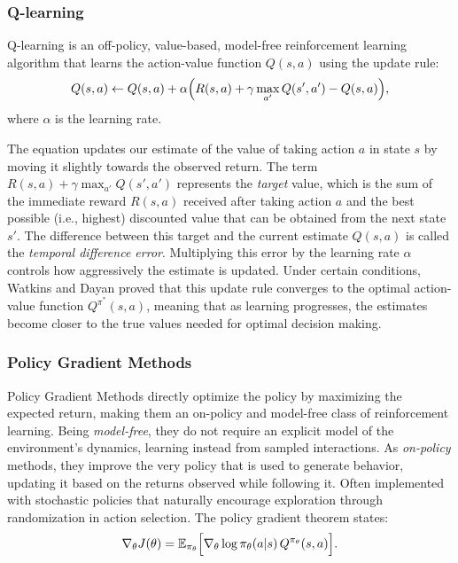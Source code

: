 \documentclass[12pt,a4paper,twoside,openany]{book}
\begin{document}
\subsubsection*{Q-learning}

Q-learning is an off-policy, value-based, model-free reinforcement learning algorithm that learns the action-value function \(Q(s,a)\) using the update rule:
\[
Q(s,a) \leftarrow Q(s,a) + \alpha \Bigl( R(s,a) + \gamma \max_{a'} Q(s', a') - Q(s,a) \Bigr),
\]
where \(\alpha\) is the learning rate.

The equation updates our estimate of the value of taking action \(a\) in state \(s\) by moving it slightly towards the observed return. The term \(R(s,a) + \gamma \max_{a'} Q(s', a')\) represents the \emph{target} value, which is the sum of the immediate reward \(R(s,a)\) received after taking action \(a\) and the best possible (i.e., highest) discounted value that can be obtained from the next state \(s'\). The difference between this target and the current estimate \(Q(s,a)\) is called the \emph{temporal difference error}. Multiplying this error by the learning rate \(\alpha\) controls how aggressively the estimate is updated. Under certain conditions, Watkins and Dayan \cite{Watkins1992} proved that this update rule converges to the optimal action-value function \(Q^{\pi^*}(s,a)\), meaning that as learning progresses, the estimates become closer to the true values needed for optimal decision making.

\subsubsection*{Policy Gradient Methods}

Policy Gradient Methods directly optimize the policy by maximizing the expected return, making them an on-policy and model-free class of reinforcement learning. Being \textit{model-free}, they do not require an explicit model of the environment’s dynamics, learning instead from sampled interactions. As \textit{on-policy} methods, they improve the very policy that is used to generate behavior, updating it based on the returns observed while following it. Often implemented with stochastic policies that naturally encourage exploration through randomization in action selection. The policy gradient theorem states:
\begin{equation}
\nabla_{\theta} J(\theta) = \mathbb{E}_{\pi_{\theta}}\Bigl[ \nabla_{\theta} \log \pi_{\theta}(a|s) \, Q^{\pi_{\theta}}(s,a) \Bigr].
\label{eq:policy_gradient}
\end{equation}
\end{document}

